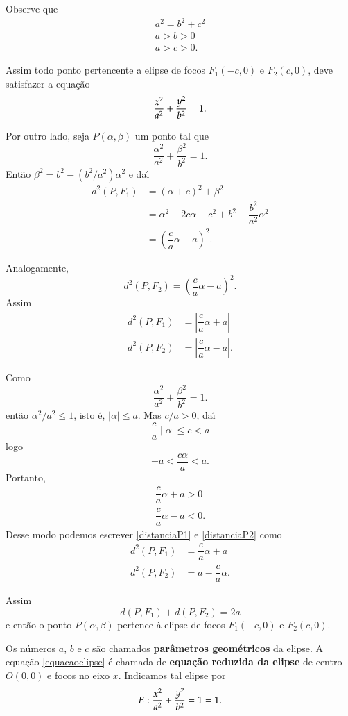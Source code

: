 Observe que
\begin{align}
  a^2 = b^2 + c^2\\
  a > b > 0\\
  a > c > 0.
\end{align}

Assim todo ponto pertencente a elipse de focos $F_1(-c,0)$ e $F_2(c,0)$, deve satisfazer a equa\c{c}\~ao
\[
  \dfrac{x^2}{a^2} + \dfrac{y^2}{b^2} = 1.
\]

Por outro lado, seja $P(\alpha,\beta)$ um ponto tal que
\[
  \dfrac{\alpha^2}{a^2} + \dfrac{\beta^2}{b^2} = 1.
\]
Ent\~ao $\beta^2 = b^2 - (b^2/a^2)\alpha^2$ e da{\'\i}
\begin{align*}
  d^2(P,F_1) &= (\alpha + c)^2 + \beta^2\\
&= \alpha^2 + 2c\alpha + c^2 + b^2 - \dfrac{b^2}{a^2}\alpha^2\\
&= \left(\dfrac{c}{a}\alpha + a\right)^2.
\end{align*}

Analogamente,
\begin{equation*}
  d^2(P,F_2) = \left(\dfrac{c}{a}\alpha - a\right)^2.
\end{equation*}
Assim
\begin{align}
  d^2(P,F_1) &= \left|\dfrac{c}{a}\alpha + a\right|\label{distanciaP1}\\
  d^2(P,F_2) &= \left|\dfrac{c}{a}\alpha - a\right|\label{distanciaP2}.
\end{align}

Como
\[
  \dfrac{\alpha^2}{a^2} + \dfrac{\beta^2}{b^2} = 1.
\]
ent\~ao $\alpha^2/a^2 \le 1$, isto \'e, $\mid\alpha\mid\le a$. Mas $c/a > 0$, da{\'\i}
\[
  \dfrac{c}{a}\mid\alpha\mid \le c < a
\]
logo
\[
  -a < \dfrac{c\alpha}{a} < a.
\]
Portanto,
\begin{align*}
  \dfrac{c}{a}\alpha + a > 0\\
  \dfrac{c}{a}\alpha - a < 0.
\end{align*}
Desse modo podemos escrever \eqref{distanciaP1} e \eqref{distanciaP2} como
\begin{align*}
  d^2(P,F_1) &= \dfrac{c}{a}\alpha + a\\
  d^2(P,F_2) &= a - \dfrac{c}{a}\alpha.
\end{align*}

Assim
\[
  d(P,F_1) + d(P,F_2) = 2a
\]
e ent\~ao o ponto $P(\alpha,\beta)$ pertence \`a elipse de focos $F_1(-c,0)$ e $F_2(c,0)$.

Os n\'umeros $a$, $b$ e $c$ s\~ao chamados \textbf{par\^ametros geom\'etricos} da elipse. A equa\c{c}\~ao \eqref{equacaoelipse} \'e chamada de \textbf{equa\c{c}\~ao reduzida da elipse} de centro $O(0,0)$ e focos no eixo $x$. Indicamos tal elipse por 
\[
  E: \dfrac{x^2}{a^2} + \dfrac{y^2}{b^2} = 1 = 1.
\]

